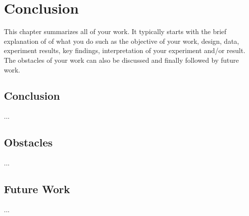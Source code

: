 \chapter{Conclusion}
This chapter summarizes all of your work. It typically starts with the brief explanation of of what you do such as the objective of your work, design, data, experiment results, key findings, interpretation of your experiment and/or result. The obstacles of your work can also be discussed and finally followed by future work. 

\section{Conclusion}
...
\section{Obstacles}
...
\section{Future Work}
...

